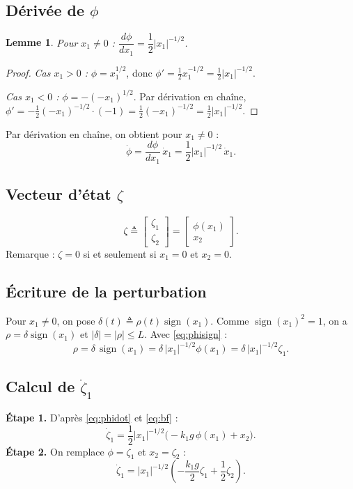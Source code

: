 \documentclass[11pt,a4paper]{article}
\numberwithin{equation}{section}
\theoremstyle{plain}
\newtheorem{lemme}[theoreme]{Lemme}
\theoremstyle{definition}
\theoremstyle{remark}
\newcommand{\sign}{\operatorname{sign}}
\begin{document}
\subsection{Dérivée de $\phi$}
\begin{lemme}\label{lem:dphi}
Pour $x_1\neq0$ : $\dfrac{d\phi}{dx_1} = \dfrac12|x_1|^{-1/2}$.
\end{lemme}
\begin{proof}
\emph{Cas $x_1>0$ :} $\phi=x_1^{1/2}$, donc $\phi' = \frac12x_1^{-1/2} = \frac12|x_1|^{-1/2}$.

\emph{Cas $x_1<0$ :} $\phi=-(-x_1)^{1/2}$. Par dérivation en chaîne,
$\phi' = -\frac12(-x_1)^{-1/2}\cdot(-1) = \frac12(-x_1)^{-1/2} = \frac12|x_1|^{-1/2}$.
\end{proof}
Par dérivation en chaîne, on obtient pour $x_1\neq0$ :
\begin{equation}\label{eq:phidot}
\dot\phi = \frac{d\phi}{dx_1}\,\dot x_1 = \frac12|x_1|^{-1/2}\,\dot x_1 .
\end{equation}

\subsection{Vecteur d'état $\zeta$}
\begin{equation}
\zeta \triangleq \begin{bmatrix}\zeta_1\\\zeta_2\end{bmatrix}= \begin{bmatrix}\phi(x_1)\\x_2\end{bmatrix}.
\end{equation}
Remarque : $\zeta=0$ si et seulement si $x_1=0$ et $x_2=0$.

\subsection{Écriture de la perturbation}
Pour $x_1\neq0$, on pose $\delta(t)\triangleq\rho(t)\sign(x_1)$. Comme $\sign(x_1)^2=1$, on a
$\rho=\delta\sign(x_1)$ et $|\delta|=|\rho|\le L$. Avec \eqref{eq:phisign} :
\begin{equation}
\rho = \delta\,\sign(x_1) = \delta\,|x_1|^{-1/2}\phi(x_1) = \delta\,|x_1|^{-1/2}\zeta_1 .
\end{equation}

\subsection{Calcul de $\dot\zeta_1$}
\textbf{Étape 1.} D'après \eqref{eq:phidot} et \eqref{eq:bf} :
\begin{equation}
\dot\zeta_1 = \frac12|x_1|^{-1/2}\Big(-k_1g\,\phi(x_1) + x_2\Big).
\end{equation}
\textbf{Étape 2.} On remplace $\phi=\zeta_1$ et $x_2=\zeta_2$ :
\begin{equation}
\dot\zeta_1 = |x_1|^{-1/2}\left(-\frac{k_1g}{2}\zeta_1 + \frac12\zeta_2\right).
\end{equation}
\end{document}
